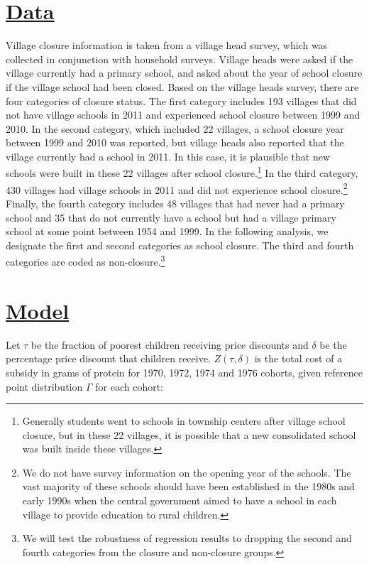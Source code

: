 \documentclass[12pt,english]{article}
\begin{document}
\section{\href{https://papers.ssrn.com/sol3/papers.cfm?abstract_id=3140132}{Data}}

Village closure information is taken from a village head survey, which was collected in conjunction with household surveys. Village heads were asked if the village currently had a primary school, and asked about the year of school closure if the village school had been closed. Based on the village heads survey, there are four categories of closure status. The first category includes 193 villages that did not have village schools in 2011 and experienced school closure between 1999 and 2010. In the second category, which included 22 villages, a school closure year between 1999 and 2010 was reported, but village heads also reported that the village currently had a school in 2011. In this case, it is plausible that new schools were built in these 22 villages after school closure.\footnote{Generally students went to schools in township centers after village school closure, but in these 22 villages, it is possible that a new consolidated school was built inside these villages.} In the third category, 430 villages had village schools in 2011 and did not experience school closure.\footnote{We do not have survey information on the opening year of the schools. The vast majority of these schools should have been established in the 1980s and early 1990s when the central government aimed to have a school in each village to provide education to rural children.} Finally, the fourth category includes 48 villages that had never had a primary school and 35 that do not currently have a school but had a village primary school at some point between 1954 and 1999. In the following analysis, we designate the first and second categories as school closure. The third and fourth categories are coded as non-closure.\footnote{We will test the robustness of regression results to dropping the second and fourth categories from the closure and non-closure groups.}


\section{\href{https://papers.ssrn.com/sol3/papers.cfm?abstract_id=3167023}{Model}\label{sec:data}}

Let $\tau$ be the fraction of poorest children receiving price discounts and $\delta$ be the percentage price discount that children receive. $Z\left(\tau,\delta\right)$ is the total cost of a subsidy in grams of protein for 1970, 1972, 1974 and 1976 cohorts, given reference point distribution $\Gamma$ for each cohort:
\end{document}
